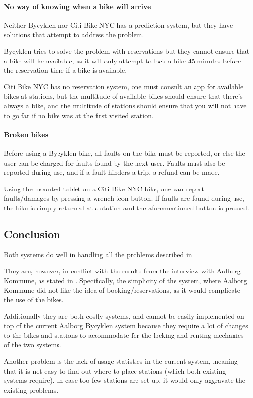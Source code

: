 \paragraph{No way of knowing when a bike will arrive}
Neither Bycyklen nor Citi Bike NYC has a prediction system, but they have solutions that attempt to address the problem.

Bycyklen tries to solve the problem with reservations but they cannot ensure that a bike will be available, as it will only attempt to lock a bike 45 minutes before the reservation time if a bike is available.

Citi Bike NYC has no reservation system, one must consult an app for available bikes at stations, but the multitude of  available bikes should ensure that there's always a bike, and the multitude of stations should ensure that you will not have to go far if no bike was at the first visited station.

\paragraph{Broken bikes}
Before using a Bycyklen bike, all faults on the bike must be reported, or else the user can be charged for faults found by the next user.
Faults must also be reported during use, and if a fault hinders a trip, a refund can be made.

Using the mounted tablet on a Citi Bike NYC bike, one can report faults/damages by pressing a wrench-icon button.
If faults are found during use, the bike is simply returned at a station and the aforementioned button is pressed.

\subsection{Conclusion}
Both systems do well in handling all the problems described in 

They are, however, in conflict with the results from the interview with Aalborg Kommune, as stated in .
Specifically, the simplicity of the system, where Aalborg Kommune did not like the idea of booking/reservations, as it would complicate the use of the bikes.

Additionally they are both costly systems, and cannot be easily implemented on top of the current Aalborg Bycyklen system because they require a lot of changes to the bikes and stations to accommodate for the locking and renting mechanics of the two systems. 

Another problem is the lack of usage statistics in the current system, meaning that it is not easy to find out where to place stations (which both existing systems require).
In case too few stations are set up, it would only aggravate the existing problems.
